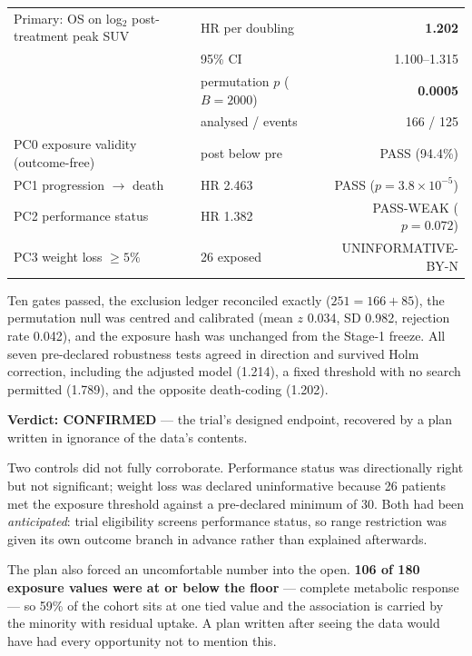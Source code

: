 \documentclass[11pt,a4paper]{article}
\begin{document}
\begin{center}
\begin{tabular}{@{}llr@{}}
\toprule
Primary: OS on log$_2$ post-treatment peak SUV & HR per doubling & \textbf{1.202} \\
& 95\% CI & 1.100--1.315 \\
& permutation $p$ ($B = 2000$) & \textbf{0.0005} \\
& analysed / events & 166 / 125 \\
\midrule
PC0 exposure validity (outcome-free) & post below pre & PASS (94.4\%) \\
PC1 progression $\rightarrow$ death & HR 2.463 & PASS ($p = 3.8\times10^{-5}$) \\
PC2 performance status & HR 1.382 & PASS-WEAK ($p = 0.072$) \\
PC3 weight loss $\geq 5\%$ & 26 exposed & UNINFORMATIVE-BY-N \\
\bottomrule
\end{tabular}
\end{center}

Ten gates passed, the exclusion ledger reconciled exactly ($251 = 166 + 85$), the permutation null
was centred and calibrated (mean $z$ 0.034, SD 0.982, rejection rate 0.042), and the exposure hash
was unchanged from the Stage-1 freeze. All seven pre-declared robustness tests agreed in direction
and survived Holm correction, including the adjusted model (1.214), a fixed threshold with no
search permitted (1.789), and the opposite death-coding (1.202).

\textbf{Verdict: CONFIRMED} --- the trial's designed endpoint, recovered by a plan written in
ignorance of the data's contents.

Two controls did not fully corroborate. Performance status was directionally right but not
significant; weight loss was declared uninformative because 26 patients met the exposure threshold
against a pre-declared minimum of 30. Both had been \emph{anticipated}: trial eligibility screens
performance status, so range restriction was given its own outcome branch in advance rather than
explained afterwards.

The plan also forced an uncomfortable number into the open. \textbf{106 of 180 exposure values
were at or below the floor} --- complete metabolic response --- so 59\% of the cohort sits at one
tied value and the association is carried by the minority with residual uptake. A plan written
after seeing the data would have had every opportunity not to mention this.
\end{document}
